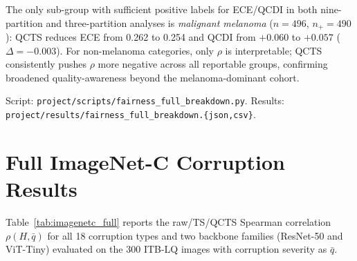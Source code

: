 \documentclass{bmvc2k}
\begin{document}
The only sub-group with sufficient positive labels for ECE/QCDI in both
nine-partition and three-partition analyses is \emph{malignant melanoma}
($n{=}496$, $n_+{=}490$): QCTS reduces ECE from 0.262 to 0.254 and QCDI
from $+0.060$ to $+0.057$ ($\Delta{=}{-}0.003$). For non-melanoma categories,
only $\rho$ is interpretable; QCTS consistently pushes $\rho$ more negative
across all reportable groups, confirming broadened quality-awareness beyond
the melanoma-dominant cohort.

Script: \texttt{project/scripts/fairness\_full\_breakdown.py}.
Results: \texttt{project/results/fairness\_full\_breakdown.\{json,csv\}}.

\section{Full ImageNet-C Corruption Results}
\label{app:imagenetc}

Table~\ref{tab:imagenetc_full} reports the raw/TS/QCTS Spearman correlation $\rho(H, \bar q)$ for all 18 corruption types and two backbone families (ResNet-50 and ViT-Tiny) evaluated on the 300 ITB-LQ images with corruption severity as $\bar q$.
\end{document}
